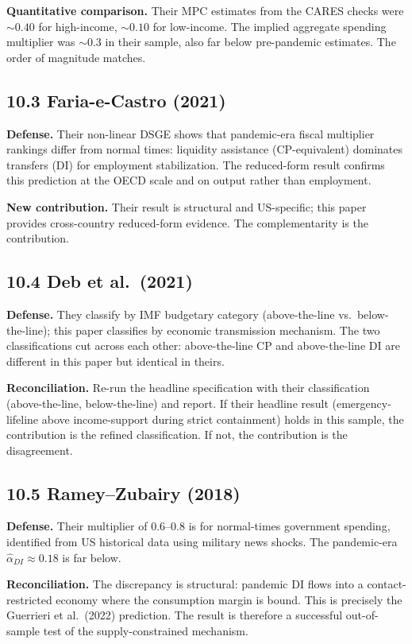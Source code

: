\documentclass[11pt,a4paper]{article}
\begin{document}
\textbf{Quantitative comparison.} Their MPC estimates from the CARES checks were $\sim 0.40$ for high-income, $\sim 0.10$ for low-income. The implied aggregate spending multiplier was $\sim 0.3$ in their sample, also far below pre-pandemic estimates. The order of magnitude matches.

\subsection*{10.3 Faria-e-Castro (2021)}

\textbf{Defense.} Their non-linear DSGE shows that pandemic-era fiscal multiplier rankings differ from normal times: liquidity assistance (CP-equivalent) dominates transfers (DI) for employment stabilization. The reduced-form result confirms this prediction at the OECD scale and on output rather than employment.

\textbf{New contribution.} Their result is structural and US-specific; this paper provides cross-country reduced-form evidence. The complementarity is the contribution.

\subsection*{10.4 Deb et al.\ (2021)}

\textbf{Defense.} They classify by IMF budgetary category (above-the-line vs.\ below-the-line); this paper classifies by economic transmission mechanism. The two classifications cut across each other: above-the-line CP and above-the-line DI are different in this paper but identical in theirs.

\textbf{Reconciliation.} Re-run the headline specification with their classification (above-the-line, below-the-line) and report. If their headline result (emergency-lifeline above income-support during strict containment) holds in this sample, the contribution is the refined classification. If not, the contribution is the disagreement.

\subsection*{10.5 Ramey--Zubairy (2018)}

\textbf{Defense.} Their multiplier of $0.6$--$0.8$ is for normal-times government spending, identified from US historical data using military news shocks. The pandemic-era $\hat\alpha_{DI} \approx 0.18$ is far below.

\textbf{Reconciliation.} The discrepancy is structural: pandemic DI flows into a contact-restricted economy where the consumption margin is bound. This is precisely the Guerrieri et al.\ (2022) prediction. The result is therefore a successful out-of-sample test of the supply-constrained mechanism.
\end{document}
